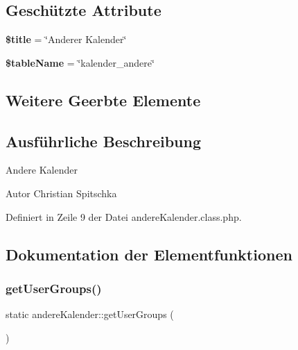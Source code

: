 \subsection*{Geschützte Attribute}
\begin{DoxyCompactItemize}
\item 
\mbox{\label{classandere_kalender_aa05c39795517e1e79d3cc7d5f545515c}} 
{\bfseries \$title} = \char`\"{}Anderer Kalender\char`\"{}
\item 
\mbox{\label{classandere_kalender_a273e8575db04d9b5bdc92b55b147e0bd}} 
{\bfseries \$table\+Name} = \char`\"{}kalender\+\_\+andere\char`\"{}
\end{DoxyCompactItemize}
\subsection*{Weitere Geerbte Elemente}


\subsection{Ausführliche Beschreibung}
Andere Kalender

\begin{DoxyAuthor}{Autor}
Christian Spitschka 
\end{DoxyAuthor}


Definiert in Zeile 9 der Datei andere\+Kalender.\+class.\+php.



\subsection{Dokumentation der Elementfunktionen}
\mbox{\label{classandere_kalender_af74f1d980abe9f70171bddcd7dad494a}} 
\subsubsection{\texorpdfstring{get\+User\+Groups()}{getUserGroups()}}
{\footnotesize\ttfamily static andere\+Kalender\+::get\+User\+Groups (\begin{DoxyParamCaption}{ }\end{DoxyParamCaption})\hspace{0.3cm}{\ttfamily [static]}}

